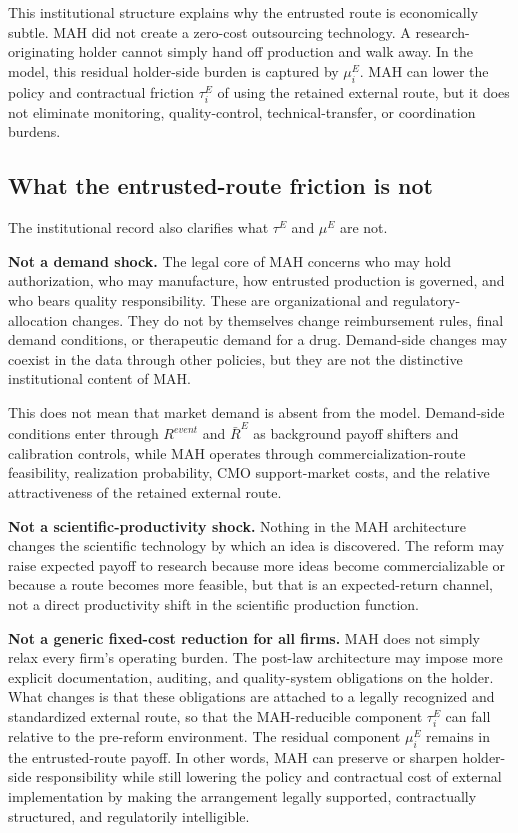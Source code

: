 \documentclass[12pt]{article}
\newcommand{\1}{\mathbf{1}}
\begin{document}
This institutional structure explains why the entrusted route is economically subtle. MAH did not create a zero-cost outsourcing technology. A research-originating holder cannot simply hand off production and walk away. In the model, this residual holder-side burden is captured by $\mu_i^E$. MAH can lower the policy and contractual friction $\tau_i^E$ of using the retained external route, but it does not eliminate monitoring, quality-control, technical-transfer, or coordination burdens.

\subsection{What the entrusted-route friction is not}

The institutional record also clarifies what $\tau^E$ and $\mu^E$ are not.

\textbf{Not a demand shock.} The legal core of MAH concerns who may hold authorization, who may manufacture, how entrusted production is governed, and who bears quality responsibility. These are organizational and regulatory-allocation changes. They do not by themselves change reimbursement rules, final demand conditions, or therapeutic demand for a drug. Demand-side changes may coexist in the data through other policies, but they are not the distinctive institutional content of MAH.

This does not mean that market demand is absent from the model. Demand-side conditions enter through $R^{event}$ and $\bar R^E$ as background payoff shifters and calibration controls, while MAH operates through commercialization-route feasibility, realization probability, CMO support-market costs, and the relative attractiveness of the retained external route.

\textbf{Not a scientific-productivity shock.} Nothing in the MAH architecture changes the scientific technology by which an idea is discovered. The reform may raise expected payoff to research because more ideas become commercializable or because a route becomes more feasible, but that is an expected-return channel, not a direct productivity shift in the scientific production function.

\textbf{Not a generic fixed-cost reduction for all firms.} MAH does not simply relax every firm's operating burden. The post-law architecture may impose more explicit documentation, auditing, and quality-system obligations on the holder. What changes is that these obligations are attached to a legally recognized and standardized external route, so that the MAH-reducible component $\tau_i^E$ can fall relative to the pre-reform environment. The residual component $\mu_i^E$ remains in the entrusted-route payoff. In other words, MAH can preserve or sharpen holder-side responsibility while still lowering the policy and contractual cost of external implementation by making the arrangement legally supported, contractually structured, and regulatorily intelligible.
\end{document}
